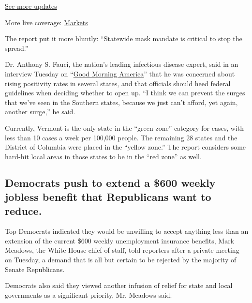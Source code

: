 \href{https://www.nytimes3xbfgragh.onion/2020/09/09/world/covid-19-coronavirus.html?action=click\&pgtype=Article\&state=default\&region=MAIN_CONTENT_1\&context=storylines_live_updates}{See
more updates}

More live coverage:
\href{https://www.nytimes3xbfgragh.onion/live/2020/09/09/business/stock-market-today-coronavirus?action=click\&pgtype=Article\&state=default\&region=MAIN_CONTENT_1\&context=storylines_live_updates}{Markets}

The report put it more bluntly: ``Statewide mask mandate is critical to
stop the spread.''

Dr. Anthony S. Fauci, the nation's leading infectious disease expert,
said in an interview Tuesday on
``\href{https://www.goodmorningamerica.com/news/story/faucis-concerned-midwest-reopening-afford-surge-72026199}{Good
Morning America}'' that he was concerned about rising positivity rates
in several states, and that officials should heed federal guidelines
when deciding whether to open up. ``I think we can prevent the surges
that we've seen in the Southern states, because we just can't afford,
yet again, another surge,'' he said.

Currently, Vermont is the only state in the ``green zone'' category for
cases, with less than 10 cases a week per 100,000 people. The remaining
28 states and the District of Columbia were placed in the ``yellow
zone.'' The report considers some hard-hit local areas in those states
to be in the ``red zone'' as well.

\hypertarget{democrats-push-to-extend-a-600-weekly-jobless-benefit-that-republicans-want-to-reduce}{%
\subsection{Democrats push to extend a \$600 weekly jobless benefit that
Republicans want to
reduce.}\label{democrats-push-to-extend-a-600-weekly-jobless-benefit-that-republicans-want-to-reduce}}

Top Democrats indicated they would be unwilling to accept anything less
than an extension of the current \$600 weekly unemployment insurance
benefits, Mark Meadows, the White House chief of staff, told reporters
after a private meeting on Tuesday, a demand that is all but certain to
be rejected by the majority of Senate Republicans.

Democrats also said they viewed another infusion of relief for state and
local governments as a significant priority, Mr. Meadows said.

